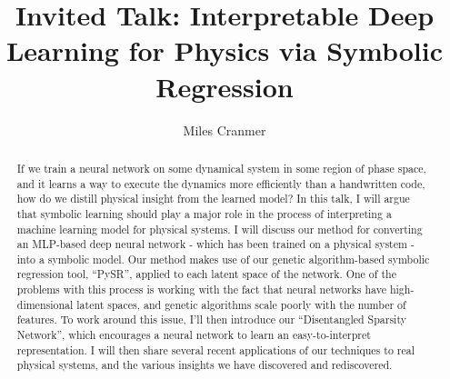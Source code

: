 \documentclass[a4paper]{easychair}%
\title{Invited Talk: Interpretable Deep Learning for Physics via Symbolic Regression}
\author{Miles Cranmer}
\institute{Princeton University}
\begin{document}
\maketitle
\begin{abstract}
  
If we train a neural network on some dynamical system in some region of phase space, and it learns a way to execute the dynamics more efficiently than a handwritten code, how do we distill physical insight from the learned model? In this talk, I will argue that symbolic learning should play a major role in the process of interpreting a machine learning model for physical systems. I will discuss our method for converting an MLP-based deep neural network - which has been trained on a physical system - into a symbolic model. Our method makes use of our genetic algorithm-based symbolic regression tool, ``PySR'', applied to each latent space of the network. One of the problems with this process is working with the fact that neural networks have high-dimensional latent spaces, and genetic algorithms scale poorly with the number of features. To work around this issue, I’ll then introduce our ``Disentangled Sparsity Network'', which encourages a neural network to learn an easy-to-interpret representation. I will then share several recent applications of our techniques to real physical systems, and the various insights we have discovered and rediscovered.


\end{abstract}
\end{document}
